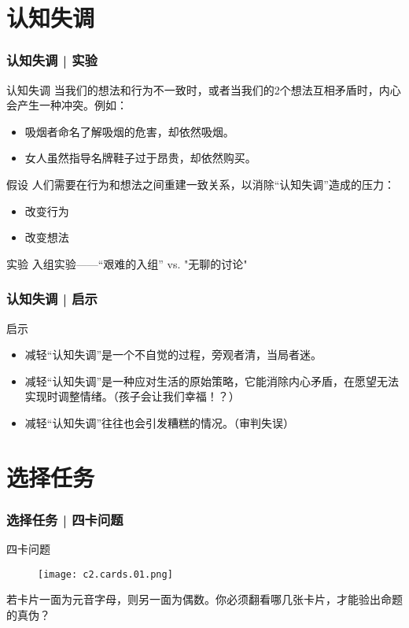 \section{认知失调}
\begin{frame}
  \frametitle{认知失调 | 实验}
  \begin{block}{认知失调}
    当我们的想法和行为不一致时，或者当我们的2个想法互相矛盾时，内心会产生一种冲突。例如：
    \begin{itemize}
      \item 吸烟者命名了解吸烟的危害，却依然吸烟。
      \item 女人虽然指导名牌鞋子过于昂贵，却依然购买。
    \end{itemize}
  \end{block}
  \pause
  \begin{block}{假设}
    人们需要在行为和想法之间重建一致关系，以消除“认知失调”造成的压力：
    \begin{itemize}
      \item 改变行为
      \item 改变想法
    \end{itemize}
  \end{block}
  \pause
  \begin{block}{实验}
    入组实验——“艰难的入组” vs. "无聊的讨论"
  \end{block}
\end{frame}

\begin{frame}
  \frametitle{认知失调 | 启示}
  \begin{block}{启示}
    \begin{itemize}
      \item 减轻“认知失调”是一个不自觉的过程，旁观者清，当局者迷。
      \item 减轻“认知失调”是一种应对生活的原始策略，它能消除内心矛盾，在愿望无法实现时调整情绪。（孩子会让我们幸福！？）
      \item 减轻“认知失调”往往也会引发糟糕的情况。（审判失误）
    \end{itemize}
  \end{block}
\end{frame}

\section{选择任务}
\begin{frame}
  \frametitle{选择任务 | 四卡问题}
  \begin{block}{四卡问题}
    \begin{figure}
      \centering
      \texttt{[image: c2.cards.01.png]}
    \end{figure}
    若卡片一面为元音字母，则另一面为偶数。你必须翻看哪几张卡片，才能验出命题的真伪？
  \end{block}
\end{frame}

